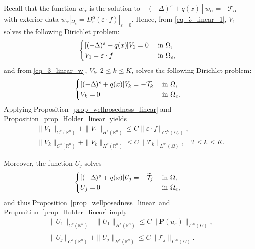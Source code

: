 \documentclass [oneside,11pt] {amsart}
\numberwithin{equation}{section}
\newcommand{\R}{\mathbb{R}}
\begin{document}
Recall that the function $w_\alpha$ is the solution to $[(-\Delta)^s   + q(x)]w_{\alpha} =- \mathcal{T}_{\alpha}$ with exterior data $w_{\alpha}|_{\Omega_e} =  D^\alpha_\varepsilon (\varepsilon\cdot f)|_{\varepsilon=0}$. 
Hence, from \eqref{eq_3_linear_1}, $V_1$ solves the following Dirichlet problem:
\begin{align}\label{EQU_V_1}
\begin{cases}
[(-\Delta)^s +q(x) ]V_1  = 0 &\hbox{ in } \Omega,\\
V_1 = \varepsilon\cdot f &\hbox{ in } \Omega_e,
\end{cases}
\end{align}
and from \eqref{eq_3_linear_w}, $V_k$, $2\le k\le K$, solves the following Dirichlet problem:
\begin{align}\label{EQU_V general}
\begin{cases}
[(-\Delta)^s +q(x) ]V_k  = -{\mathcal{T}}_k &\hbox{ in } \Omega,\\
V_k = 0 &\hbox{ in } \Omega_e.
\end{cases}
\end{align}
Applying Proposition~\ref{prop_wellposedness_linear} and Proposition~\ref{prop_Holder_linear} yields
\begin{equation}\label{EST: V_1 V_k}
\begin{aligned}
&\|V_1\|_{C^s(\R^n)}+\|V_1\|_{H^s(\R^n)}\leq C\|\varepsilon\cdot f\|_{C^\infty_c(\Omega_e)}, \\
&\|V_k\|_{C^s(\R^n)}+\|V_k\|_{H^s(\R^n)}\leq C\|{\mathcal{T}}_k\|_{L^\infty(\Omega)},\quad 2\leq k\leq K.
\end{aligned}
\end{equation}

Moreover, the function $U_j$ solves
\begin{align}\label{EQU_U general}
\begin{cases}
[(-\Delta)^s +q(x) ]U_j  = -\widetilde{\mathcal{T}}_j &\hbox{ in } \Omega,\\
U_j = 0 &\hbox{ in } \Omega_e,
\end{cases}
\end{align}
and thus Proposition~\ref{prop_wellposedness_linear} and Proposition~\ref{prop_Holder_linear} imply 
\begin{equation}\label{EST:U_j}  
\begin{aligned}
&\|U_1\|_{C^s(\R^n)}+\|U_1\|_{H^s(\R^n)}
\le  C\|\mathbf{P}(u_\varepsilon) \|_{L^\infty(\Omega)},\\
&\|U_j\|_{C^s(\R^n)}+\|U_j\|_{H^s(\R^n)}
\le  C\|\widetilde{\mathcal{T}}_{j}\|_{L^\infty(\Omega)}. 
\end{aligned}
\end{equation}
\end{document}
